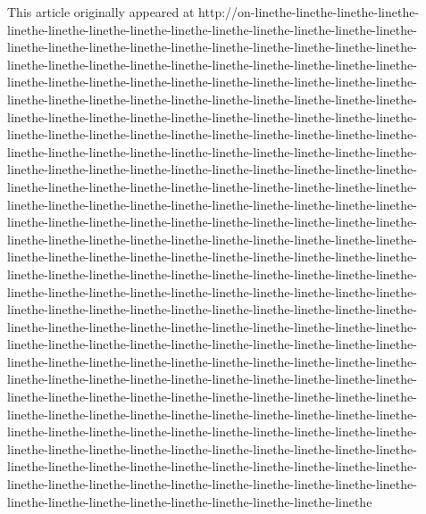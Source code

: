 \documentclass{article}
\begin{document}
This article originally appeared at http://on-linethe-linethe-linethe-linethe-linethe-linethe-linethe-linethe-linethe-linethe-linethe-linethe-linethe-linethe-linethe-linethe-linethe-linethe-linethe-linethe-linethe-linethe-linethe-linethe-linethe-linethe-linethe-linethe-linethe-linethe-linethe-linethe-linethe-linethe-linethe-linethe-linethe-linethe-linethe-linethe-linethe-linethe-linethe-linethe-linethe-linethe-linethe-linethe-linethe-linethe-linethe-linethe-linethe-linethe-linethe-linethe-linethe-linethe-linethe-linethe-linethe-linethe-linethe-linethe-linethe-linethe-linethe-linethe-linethe-linethe-linethe-linethe-linethe-linethe-linethe-linethe-linethe-linethe-linethe-linethe-linethe-linethe-linethe-linethe-linethe-linethe-linethe-linethe-linethe-linethe-linethe-linethe-linethe-linethe-linethe-linethe-linethe-linethe-linethe-linethe-linethe-linethe-linethe-linethe-linethe-linethe-linethe-linethe-linethe-linethe-linethe-linethe-linethe-linethe-linethe-linethe-linethe-linethe-linethe-linethe-linethe-linethe-linethe-linethe-linethe-linethe-linethe-linethe-linethe-linethe-linethe-linethe-linethe-linethe-linethe-linethe-linethe-linethe-linethe-linethe-linethe-linethe-linethe-linethe-linethe-linethe-linethe-linethe-linethe-linethe-linethe-linethe-linethe-linethe-linethe-linethe-linethe-linethe-linethe-linethe-linethe-linethe-linethe-linethe-linethe-linethe-linethe-linethe-linethe-linethe-linethe-linethe-linethe-linethe-linethe-linethe-linethe-linethe-linethe-linethe-linethe-linethe-linethe-linethe-linethe-linethe-linethe-linethe-linethe-linethe-linethe-linethe-linethe-linethe-linethe-linethe-linethe-linethe-linethe-linethe-linethe-linethe-linethe-linethe-linethe-linethe-linethe-linethe-linethe-linethe-linethe-linethe-linethe-linethe-linethe-linethe-linethe-linethe-linethe-linethe-linethe-linethe-linethe-linethe-linethe-linethe-linethe-linethe-linethe-linethe-linethe-linethe-linethe-linethe-linethe-linethe-linethe-linethe-linethe-linethe-linethe-linethe-linethe-linethe-linethe-linethe-linethe-linethe-linethe-linethe-linethe-linethe-linethe-linethe-linethe-linethe-linethe-linethe-linethe-linethe-linethe-linethe-linethe-linethe-linethe-linethe-linethe-linethe-linethe-linethe-linethe-linethe-linethe-linethe-linethe-linethe-linethe-linethe-linethe-linethe-linethe-linethe-linethe
\end{document}
